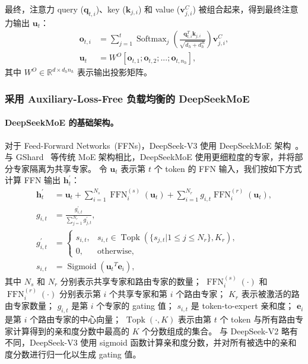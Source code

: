 \documentclass[11pt, a4paper, logo, copyright, nonumbering]{deepseek}
\newcommand{\dsvii}{DeepSeek-V2}
\newcommand{\dsmoe}{DeepSeekMoE}
\newcommand{\dsviii}{DeepSeek-V3}
\begin{document}
最终，注意力 query ($\mathbf{q}_{t, i}$)、key ($\mathbf{k}_{j, i}$) 和 value ($\mathbf{v}_{j, i}^{C}$) 被组合起来，得到最终注意力输出 $\mathbf{u}_{t}$：
\begin{align}
    \mathbf{o}_{t, i} &= \sum_{j=1}^{t} \operatorname{Softmax}_j(\frac{\mathbf{q}_{t, i}^T \mathbf{k}_{j, i}}{\sqrt{d_{h} + d_{h}^{R}}}) \mathbf{v}_{j, i}^{C}, \\
    \mathbf{u}_{t} &= W^{O} [\mathbf{o}_{t, 1};\mathbf{o}_{t, 2};...;\mathbf{o}_{t, n_{h}}],
\end{align}
其中 $W^{O} \in \mathbb{R}^{d \times d_h n_h}$ 表示输出投影矩阵。

\subsubsection{采用 Auxiliary-Loss-Free 负载均衡的 \dsmoe{}}

\paragraph{\dsmoe{} 的基础架构。}
对于 Feed-Forward Networks~(FFNs)，\dsviii{} 使用 \dsmoe{} 架构~\citep{deepseekmoe}。
与 GShard~\citep{gshard} 等传统 MoE 架构相比，\dsmoe{} 使用更细粒度的专家，并将部分专家隔离为共享专家。
令 $\mathbf{u}_{t}$ 表示第 $t$ 个 token 的 FFN 输入，我们按如下方式计算 FFN 输出 $\mathbf{h}_{t}^{\prime}$：
\begin{align}
    \mathbf{h}_{t}^{\prime} & = \mathbf{u}_{t} + \sum_{i=1}^{N_{s}} {\operatorname{FFN}^{(s)}_{i}\left( \mathbf{u}_{t} \right)} + \sum_{i=1}^{N_r} {g_{i,t} \operatorname{FFN}^{(r)}_{i}\left( \mathbf{u}_{t} \right)}, \\
    g_{i,t} & = \frac{g^{\prime}_{i,t}}{\sum_{j=1}^{N_r} g^{\prime}_{j,t}}, \\
    g^{\prime}_{i,t} & = \begin{cases} 
    s_{i,t}, & s_{i,t} \in \operatorname{Topk} (\{ s_{j, t} | 1 \leq j \leq N_r \}, K_{r}), \\
    0, & \text{otherwise}, 
    \end{cases} \\
    s_{i,t} & = \operatorname{Sigmoid} \left( {\mathbf{u}_{t}}^{T} \mathbf{e}_{i} \right),
\end{align}
其中 $N_{s}$ 和 $N_r$ 分别表示共享专家和路由专家的数量；
$\operatorname{FFN}^{(s)}_{i}(\cdot)$ 和 $\operatorname{FFN}^{(r)}_{i}(\cdot)$ 分别表示第 $i$ 个共享专家和第 $i$ 个路由专家；
$K_{r}$ 表示被激活的路由专家数量；
$g_{i,t}$ 是第 $i$ 个专家的 gating 值；
$s_{i,t}$ 是 token-to-expert 亲和度；
$\mathbf{e}_{i}$ 是第 $i$ 个路由专家的中心向量；
$\operatorname{Topk}(\cdot, K)$ 表示由第 $t$ 个 token 与所有路由专家计算得到的亲和度分数中最高的 $K$ 个分数组成的集合。
与 \dsvii{} 略有不同，\dsviii{} 使用 sigmoid 函数计算亲和度分数，并对所有被选中的亲和度分数进行归一化以生成 gating 值。
\end{document}
